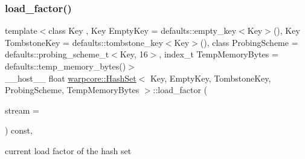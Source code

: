 \subsubsection{\texorpdfstring{load\+\_\+factor()}{load\_factor()}}
{\footnotesize\ttfamily template$<$class Key , Key Empty\+Key = defaults\+::empty\+\_\+key$<$\+Key$>$(), Key Tombstone\+Key = defaults\+::tombstone\+\_\+key$<$\+Key$>$(), class Probing\+Scheme  = defaults\+::probing\+\_\+scheme\+\_\+t$<$\+Key, 16$>$, index\+\_\+t Temp\+Memory\+Bytes = defaults\+::temp\+\_\+memory\+\_\+bytes()$>$ \\
\+\_\+\+\_\+host\+\_\+\+\_\+ float \hyperlink{classwarpcore_1_1HashSet}{warpcore\+::\+Hash\+Set}$<$ Key, Empty\+Key, Tombstone\+Key, Probing\+Scheme, Temp\+Memory\+Bytes $>$\+::load\+\_\+factor (\begin{DoxyParamCaption}\item[{cuda\+Stream\+\_\+t}]{stream = {} }\end{DoxyParamCaption}) const\hspace{0.3cm}{\ttfamily [inline]}, {\ttfamily [noexcept]}}



current load factor of the hash set 



